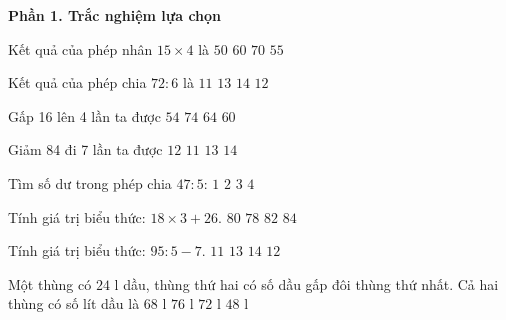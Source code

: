 \textbf{Phần 1. Trắc nghiệm lựa chọn}

\begin{ex} %
Kết quả của phép nhân $15 \times 4$ là
\choice
{$50$}
{\True $60$}
{$70$}
{$55$}
\end{ex}

\begin{ex} %
Kết quả của phép chia $72 : 6$ là
\choice
{$11$}
{$13$}
{$14$}
{\True $12$}
\end{ex}

\begin{ex} %
Gấp 16 lên 4 lần ta được
\choice
{$54$}
{$74$}
{\True $64$}
{$60$}
\end{ex}

\begin{ex} %
Giảm 84 đi 7 lần ta được
\choice
{\True $12$}
{$11$}
{$13$}
{$14$}
\end{ex}

\begin{ex} %
Tìm số dư trong phép chia $47 : 5$:
\choice
{$1$}
{\True $2$}
{$3$}
{$4$}
\end{ex}

\begin{ex} %
Tính giá trị biểu thức: $18 \times 3 + 26$.
\choice
{\True $80$}
{$78$}
{$82$}
{$84$}
\end{ex}

\begin{ex} %
Tính giá trị biểu thức: $95 : 5 - 7$.
\choice
{$11$}
{$13$}
{$14$}
{\True $12$}
\end{ex}

\begin{ex} %
Một thùng có $24\text{ l}$ dầu, thùng thứ hai có số dầu gấp đôi thùng thứ nhất. Cả hai thùng có số lít dầu là
\choice
{$68\text{ l}$}
{$76\text{ l}$}
{\True $72\text{ l}$}
{$48\text{ l}$}
\end{ex}

